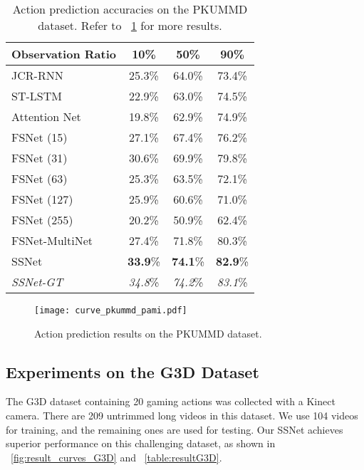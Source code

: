 \documentclass[10pt,twocolumn,letterpaper]{article}
\begin{document}
\begin{table}[htbp]
	\caption{Action prediction accuracies on the PKUMMD dataset.
     Refer to \figurename{~\ref{fig:result_curves_PKUMMD}} for more results.
	}
	\label{table:resultPKUMMD}
	\centering
    \small
	\begin{tabular}{lccc}
    \toprule
    Observation Ratio                    & 10\%   & 50\%   & 90\% \\
    \midrule
    JCR-RNN                              & 25.3\% & 64.0\% & 73.4\% \\
    ST-LSTM                              & 22.9\% & 63.0\% & 74.5\% \\
    Attention Net                        & 19.8\% & 62.9\% & 74.9\% \\
    \midrule
    FSNet (15)                           & 27.1\% & 67.4\% & 76.2\% \\
    FSNet (31)                           & 30.6\% & 69.9\% & 79.8\% \\
    FSNet (63)                           & 25.3\% & 63.5\% & 72.1\% \\
    FSNet (127)                          & 25.9\% & 60.6\% & 71.0\% \\
    FSNet (255)                          & 20.2\% & 50.9\% & 62.4\% \\
    FSNet-MultiNet                       & 27.4\% & 71.8\% & 80.3\% \\
    \midrule
    SSNet                                & \textbf{33.9}\%& \textbf{74.1}\% & \textbf{82.9}\% \\
    \midrule
    \emph{SSNet-GT}                      & \emph{34.8}\% & \emph{74.2}\% & \emph{83.1}\% \\
    \bottomrule
	\end{tabular}
\end{table}

\begin{figure}[htbp]
		\centering
		\centerline{\texttt{[image: curve\_pkummd\_pami.pdf]}}
	\caption{Action prediction results on the PKUMMD dataset.}
	\label{fig:result_curves_PKUMMD}
\end{figure}



\subsection{Experiments on the G3D Dataset}

The G3D dataset \cite{bloom2012g3d} containing 20 gaming actions was collected with a Kinect camera.
There are 209 untrimmed long videos in this dataset.
We use 104 videos for training, and the remaining ones are used for testing.
Our SSNet achieves superior performance on this challenging dataset, as shown in \figurename{~\ref{fig:result_curves_G3D}} and \tablename{~\ref{table:resultG3D}}.
\end{document}
